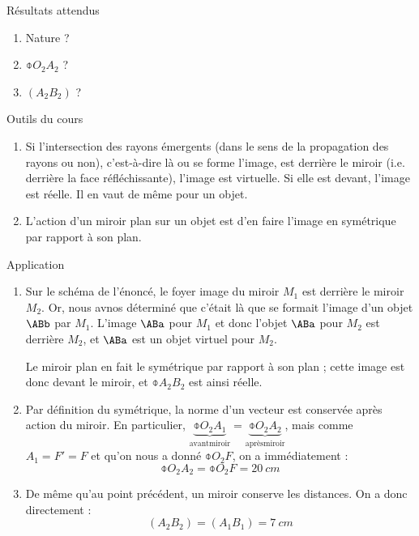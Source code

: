 \documentclass[10pt,a5paper,notitlepage]{book}
\begin{document}
\begin{NCprop}{Résultats attendus}
    \begin{enumerate}
        \item Nature ?
        \item $\obar{O_2A_2}$ ?
        \item $\left( A_2B_2 \right)$ ?
    \end{enumerate}
\end{NCprop}

\begin{NCdemo}{Outils du cours}
    \begin{enumerate}
        \item Si l'intersection des rayons émergents (dans le sens de la
            propagation des rayons ou non), c'est-à-dire là ou se forme l'image,
            est derrière le miroir (i.e. derrière la face réfléchissante),
            l'image est virtuelle. Si elle est devant, l'image est réelle. Il en
            vaut de même pour un objet.
        \item L'action d'un miroir plan sur un objet est d'en faire l'image en
            symétrique par rapport à son plan.
    \end{enumerate}
\end{NCdemo}

\begin{NCexem}{Application}
    \begin{enumerate}
        \item Sur le schéma de l'énoncé, le foyer image du miroir $M_1$ est
            derrière le miroir $M_2$. Or, nous avnos déterminé que c'était là
            que se formait l'image d'un objet $\ABb$ par $M_1$. L'image $\ABa$
            pour $M_1$ et donc l'objet $\ABa$ pour $M_2$ est derrière $M_2$, et
            $\ABa$ est un objet virtuel pour $M_2$.

            Le miroir plan en fait le symétrique par rapport à son plan ;
            cette image est donc devant le miroir, et $\obar{A_2B_2}$ est ainsi
            réelle.

        \item Par définition du symétrique, la norme d'un vecteur est conservée
            après action du miroir. En particulier,
            $\underbrace{\obar{O_2A_1}}_\mathrm{avant miroir} =
            \underbrace{\obar{O_2A_2}}_\mathrm{après miroir}$, mais comme $A_1 = F' =
            F$ et qu'on nous a donné $\obar{O_2F}$, on a immédiatement :
            \[ \boxed{\obar{O_2A_2}= \obar{O_2F} = \SI{20}{cm}} \]

        \item De même qu'au point précédent, un miroir conserve les distances.
            On a donc directement :
            \[ \boxed{ \left(A_2B_2\right) = \left(A_1B_1\right)
                                           = \SI{7}{cm}} \]
    \end{enumerate}
\end{NCexem}
\end{document}
